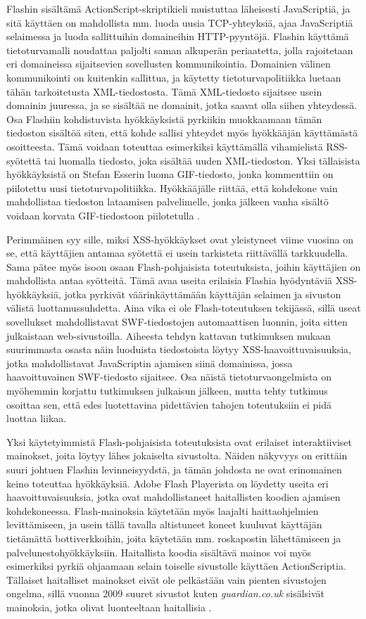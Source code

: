 Flashin sisältämä ActionScript-skriptikieli muistuttaa läheisesti JavaScriptiä, ja sitä käyttäen on mahdollista mm. luoda uusia TCP-yhteyksiä, ajaa JavaScriptiä selaimessa ja luoda sallittuihin 
domaineihin HTTP-pyyntöjä. Flashin käyttämä tietoturvamalli noudattaa paljolti saman alkuperän periaatetta, jolla rajoitetaan eri domaineissa sijaitsevien sovellusten kommunikointia. Domainien
välinen kommunikointi on kuitenkin sallittua, ja käytetty tietoturvapolitiikka luetaan tähän tarkoitetusta XML-tiedostosta. Tämä XML-tiedosto sijaitsee usein domainin juuressa, ja se sisältää ne 
domainit, jotka saavat olla siihen yhteydessä. Osa Flashiin kohdistuvista hyökkäyksistä pyrkiikin muokkaamaan tämän tiedoston sisältöä siten, että kohde sallisi yhteydet myös hyökkääjän käyttämästä
osoitteesta. Tämä voidaan toteuttaa esimerkiksi käyttämällä vihamielistä RSS-syötettä tai luomalla tiedosto, joka sisältää uuden XML-tiedoston. Yksi tällaisista hyökkäyksistä on Stefan Esserin 
luoma GIF-tiedosto, jonka kommenttiin on piilotettu uusi tietoturvapolitiikka. Hyökkääjälle riittää, että kohdekone vain mahdollistaa tiedoston lataamisen palvelimelle, jonka jälkeen vanha 
sisältö voidaan korvata GIF-tiedostoon piilotetulla \cite{WEB2}. 

Perimmäinen syy sille, miksi XSS-hyökkäykset ovat yleistyneet viime vuosina on se, että käyttäjien antamaa syötettä ei usein tarkisteta riittävällä tarkkuudella. Sama pätee myös isoon osaan 
Flash-pohjaisista toteutuksista, joihin käyttäjien on mahdollista antaa syötteitä. Tämä avaa useita erilaisia Flashia hyödyntäviä XSS-hyökkäyksiä, jotka pyrkivät väärinkäyttämään käyttäjän selaimen
ja sivuston välistä luottamussuhdetta. Aina vika ei ole Flash-toteutuksen tekijässä, sillä useat sovellukset mahdollistavat SWF-tiedostojen automaattisen luonnin, joita sitten julkaistaan
web-sivustoilla. Aiheesta tehdyn kattavan tutkimuksen mukaan \cite{FlashXSS} suurimmasta osasta näin luoduista tiedostoista löytyy XSS-haavoittuvaisuuksia, jotka mahdollistavat JavaScriptin ajamisen 
siinä domainissa, jossa haavoittuvainen SWF-tiedosto sijaitsee. Osa näistä tietoturvaongelmista on myöhemmin korjattu tutkimuksen julkaisun jälkeen, mutta tehty tutkimus osoittaa sen, että edes 
luotettavina pidettävien tahojen toteutuksiin ei pidä luottaa liikaa. 

Yksi käytetyimmistä Flash-pohjaisista toteutuksista ovat erilaiset interaktiiviset mainokset, joita löytyy lähes jokaiselta sivustolta. Näiden näkyvyys on erittäin suuri johtuen Flashin levinneisyydstä,
ja tämän johdosta ne ovat erinomainen keino toteuttaa hyökkäyksiä. Adobe Flash Playerista on löydetty useita eri haavoittuvaisuuksia, jotka ovat mahdollistaneet haitallisten koodien ajamisen 
kohdekoneessa. Flash-mainoksia käytetään myös laajalti haittaohjelmien levittämiseen, ja usein tällä tavalla altistuneet koneet kuuluvat käyttäjän tietämättä bottiverkkoihin, joita käytetään
mm. roskapostin lähettämiseen ja palvelunestohyökkäyksiin. Haitallista koodia sisältävä mainos voi myös esimerkiksi pyrkiä ohjaamaan selain toiselle sivustolle käyttäen ActionScriptia.
Tällaiset haitalliset mainokset eivät ole pelkästään vain pienten sivustojen ongelma, sillä vuonna 2009 suuret sivustot kuten \emph{guardian.co.uk} sisälsivät mainoksia, jotka olivat luonteeltaan 
haitallisia \cite{FlashAdd}. 

